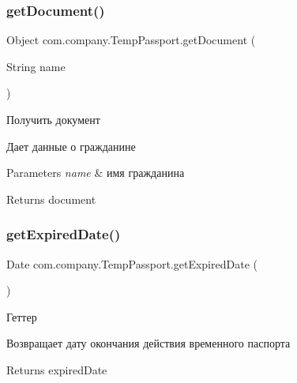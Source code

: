 \subsubsection{\texorpdfstring{get\+Document()}{getDocument()}}
{\footnotesize\ttfamily Object com.\+company.\+Temp\+Passport.\+get\+Document (\begin{DoxyParamCaption}\item[{String}]{name }\end{DoxyParamCaption})\hspace{0.3cm}{\ttfamily [inline]}}



Получить документ 

Дает данные о гражданине 
\begin{DoxyParams}{Parameters}
{\em name} & имя гражданина \\
\hline
\end{DoxyParams}
\begin{DoxyReturn}{Returns}
document 
\end{DoxyReturn}
\mbox{\label{classcom_1_1company_1_1TempPassport_ae25b090b629cf145991f4f66d4d0ba86}} 
\subsubsection{\texorpdfstring{get\+Expired\+Date()}{getExpiredDate()}}
{\footnotesize\ttfamily Date com.\+company.\+Temp\+Passport.\+get\+Expired\+Date (\begin{DoxyParamCaption}{ }\end{DoxyParamCaption})\hspace{0.3cm}{\ttfamily [inline]}}



Геттер 

Возвращает дату окончания действия временного паспорта \begin{DoxyReturn}{Returns}
expired\+Date 
\end{DoxyReturn}
\mbox{\label{classcom_1_1company_1_1TempPassport_ae72565902824ef39a74e4eb60d31e95e}} 

